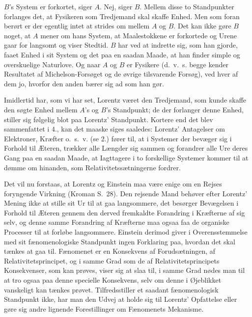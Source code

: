 \documentclass[12pt,a4paper]{article}
\newcommand{\opage}[1]{\marginnote{\footnotesize\textit{[#1]}}}
\begin{document}
\guillemotright $B$'s System er forkortet, siger $A$. Nej, siger
$B$.\guillemotleft{} Mellem disse to Standpunkter forlanges det, at
Fysikeren som Tredjemand skal skaffe Enhed. Men som foran berørt er der
egentlig intet at strides om mellem $A$ og $B$. Det kan ikke gøre $B$
noget, at $A$ mener om hans System, at Maalestokkene er forkortede og
Urene gaar for langsomt og viser Stedtid. $B$ har ved at indrette sig,
som han gjorde, faaet Enhed i sit System og det paa en saadan Maade, at
han finder simple og overskuelige Naturlove. Og naar $A$ og $B$ er
Fysikere (d.~v.~s. begge kender Resultatet af Michelson-Forsøget og de
øvrige tilsvarende Forsøg), ved hver af dem jo, hvorfor den anden bærer
sig ad som han gør.

Imidlertid har, som vi har set, Lorentz været den Tredjemand, som kunde
skaffe den søgte Enhed mellem $A$'s og $B$'s Standpunkt; de der
forlanger denne Enhed, stiller sig følgelig blot paa Lorentz'
Standpunkt. Kortere end det blev sammenfattet i 4., kan det maaske
siges saaledes: Lorentz' Antagelser om Elektroner, Kræfter o.~s.~v. (se
2.) fører til, at i Systemer der bevæger sig i Forhold til Æteren,
trækker alle Længder sig sammen og forandrer alle Ure deres Gang paa en
saadan Maade, at Iagttagere i to forskellige Systemer kommer til at
dømme om hinanden, som Relativitetssætningerne fordrer.

Det vil nu forstaas, at Lorentz og Einstein maa være enige om en Rejses
foryngende Virkning (Kroman S.~28). Den rejsende Mand behøver efter
Lorentz' Mening ikke at stille sit Ur til at gaa langsommere, det
besørger Bevægelsen i Forhold til Æteren gennem den
\opage{26} %
derved fremkaldte Forandring i Kræfterne af sig selv, og denne samme
Forandring af Kræfterne maa ogsaa faa de organiske Processer til at
forløbe langsommere. Einstein derimod giver i Overensstemmelse med sit
fænomenologiske Standpunkt ingen Forklaring paa, hvordan det skal
tænkes at \guillemotright gaa til\guillemotleft . Fænomenet er en
Konsekvens af Forudsætningen, af Relativitetsprincipet, og i samme Grad
som de af Relativitetsprincipets Konsekvenser, som kan prøves, viser
sig at slaa til, i samme Grad nødes man til at tro ogsaa paa denne
specielle Konsekvens, selv om denne i Øjeblikket vanskeligt kan tænkes
prøvet. Tilfredsstiller et saadant fænomenologisk Standpunkt ikke, har
man den Udvej at holde sig til Lorentz' Opfattelse eller gøre sig andre
lignende Forestillinger om Fænomenets Mekanisme.
\end{document}
